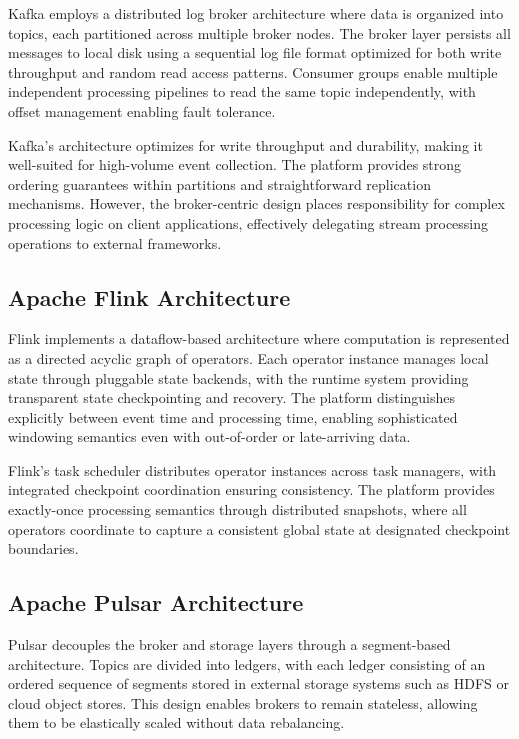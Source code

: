 \documentclass[10pt,twocolumn]{article}
\begin{document}
Kafka employs a distributed log broker architecture where data is organized into topics, each partitioned across multiple broker nodes. The broker layer persists all messages to local disk using a sequential log file format optimized for both write throughput and random read access patterns. Consumer groups enable multiple independent processing pipelines to read the same topic independently, with offset management enabling fault tolerance.

Kafka's architecture optimizes for write throughput and durability, making it well-suited for high-volume event collection. The platform provides strong ordering guarantees within partitions and straightforward replication mechanisms. However, the broker-centric design places responsibility for complex processing logic on client applications, effectively delegating stream processing operations to external frameworks.

\subsection{Apache Flink Architecture}

Flink implements a dataflow-based architecture where computation is represented as a directed acyclic graph of operators. Each operator instance manages local state through pluggable state backends, with the runtime system providing transparent state checkpointing and recovery. The platform distinguishes explicitly between event time and processing time, enabling sophisticated windowing semantics even with out-of-order or late-arriving data.

Flink's task scheduler distributes operator instances across task managers, with integrated checkpoint coordination ensuring consistency. The platform provides exactly-once processing semantics through distributed snapshots, where all operators coordinate to capture a consistent global state at designated checkpoint boundaries.

\subsection{Apache Pulsar Architecture}

Pulsar decouples the broker and storage layers through a segment-based architecture. Topics are divided into ledgers, with each ledger consisting of an ordered sequence of segments stored in external storage systems such as HDFS or cloud object stores. This design enables brokers to remain stateless, allowing them to be elastically scaled without data rebalancing.
\end{document}
